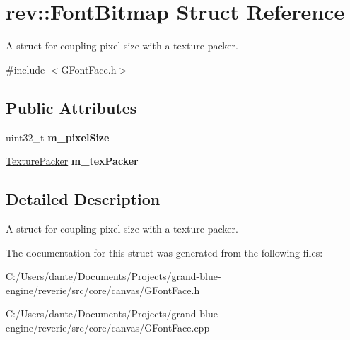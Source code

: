\hypertarget{structrev_1_1_font_bitmap}{}\section{rev\+::Font\+Bitmap Struct Reference}
\label{structrev_1_1_font_bitmap}


A struct for coupling pixel size with a texture packer.  




{\ttfamily \#include $<$G\+Font\+Face.\+h$>$}

\subsection*{Public Attributes}
\begin{DoxyCompactItemize}
\item 
\mbox{\label{structrev_1_1_font_bitmap_a5138fa373f78cefcabf2adc6eec72c09}} 
uint32\+\_\+t {\bfseries m\+\_\+pixel\+Size}
\item 
\mbox{\label{structrev_1_1_font_bitmap_a6c9e3766c66be2abc73d63df82caadb2}} 
\mbox{\hyperlink{classrev_1_1_texture_packer}{Texture\+Packer}} {\bfseries m\+\_\+tex\+Packer}
\end{DoxyCompactItemize}


\subsection{Detailed Description}
A struct for coupling pixel size with a texture packer. 

The documentation for this struct was generated from the following files\+:\begin{DoxyCompactItemize}
\item 
C\+:/\+Users/dante/\+Documents/\+Projects/grand-\/blue-\/engine/reverie/src/core/canvas/G\+Font\+Face.\+h\item 
C\+:/\+Users/dante/\+Documents/\+Projects/grand-\/blue-\/engine/reverie/src/core/canvas/G\+Font\+Face.\+cpp\end{DoxyCompactItemize}
